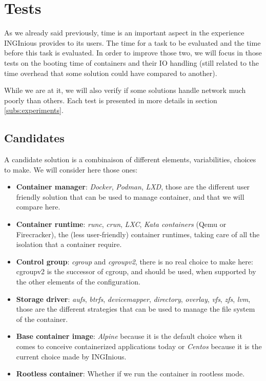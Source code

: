 \section{Tests}
As we already said previously, time is an important aspect in the experience INGInious provides to its users.  The time for a task to be evaluated and the time before this task is evaluated.  In order to improve those two, we will focus in those tests on the booting time of containers and their IO handling (still related to the time overhead that some solution could have compared to another).

While we are at it, we will also verify if some solutions handle network much poorly than others.  Each test is presented in more details in section \ref{subs:experiments}.


\subsection{Candidates}\label{subs:candidates}
A candidate solution is a combinaison of different elements, variabilities, choices to make.  We will consider here those ones:
\begin{itemize}
  \renewcommand\labelitemi{--}
  \item \textbf{Container manager}: \textit{Docker}, \textit{Podman}, \textit{LXD}, those are the different user friendly solution that can be used to manage container, and that we will compare here.
  \item \textbf{Container runtime}: \textit{runc}, \textit{crun}, \textit{LXC}, \textit{Kata containers} (Qemu or Firecracker), the (less user-friendly) container runtimes, taking care of all the isolation that a container require.
  \item \textbf{Control group}: \textit{cgroup} and \textit{cgroupv2}, there is no real choice to make here: cgroupv2 is the successor of cgroup, and should be used, when supported by the other elements of the configuration.
  \item \textbf{Storage driver}: \textit{aufs}, \textit{btrfs}, \textit{devicemapper}, \textit{directory}, \textit{overlay}, \textit{vfs}, \textit{zfs}, \textit{lvm}, those are the different strategies that can be used to manage the file system of the container.
  \item \textbf{Base container image}: \textit{Alpine} because it is the default choice when it comes to conceive containerized applications today or \textit{Centos} because it is the current choice made by INGInious.
  \item \textbf{Rootless container}: Whether if we run the container in rootless mode.
\end{itemize}

